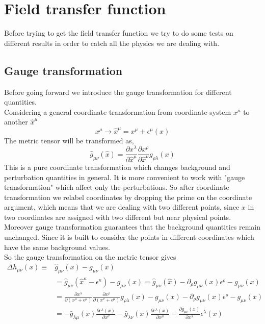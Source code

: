 \documentclass[a4paper,14pt]{article}
\newcommand {\be}{\begin{equation}}
\newcommand {\ee}{\end{equation}}
\begin{document}
\section{Field transfer function}
Before trying to get the field transfer function we try to do some tests on different results in order to catch all the physics we are dealing with.
\subsection{Gauge transformation}
Before going forward we introduce the gauge transformation for different quantities. \\
Considering a general coordinate transformation from coordinate system $x^{\mu}$ to another $\hat{x} ^{\mu}$ 
\be
x^{\mu} \longrightarrow {\hat{x}}^{\mu}  = x^{\mu} + \epsilon^{\mu} (x)
\ee
The metric tensor will be transformed as,
\be
\hat{g}_{\mu \nu} (\hat{x})=  \frac{\partial x^{\lambda}}{\partial \hat{x}^{\mu} } \frac{\partial x^{\rho}}{\partial \hat{x}^{\nu} } g _{\rho \lambda} (x)
\ee
This is a pure coordinate transformation which changes background and perturbation quantities in general. It is more convenient to work with "gauge transformation" which affect only the perturbations. So after coordinate transformation we relabel coordinates by dropping the prime on the coordinate argument, which means that we are dealing with two different points, since $x$ in two coordinates are assigned with two different but near physical points. Moreover gauge transformation guarantees that the background quantities remain unchanged. Since it is built to consider the points in different coordinates which have the same background values.\\ 
So the gauge transformation on the metric tensor gives 
\begin{align}
\Delta h_{\mu \nu} (x)   \equiv  &\hat{g}_{\mu \nu}(x) - g_{\mu \nu} (x) \\ \nonumber &
=\hat{g}_{\mu \nu}(\hat{x}^{ \kappa} -\epsilon^{\kappa}) - g_{\mu \nu} (x) =\hat{g}_{\mu \nu}(\hat{x} ) - \partial_{\rho } g_{\mu \nu} (x^{}) \epsilon^{\rho}  - g_{\mu \nu} (x)
 \\ \nonumber &
 =   \frac{\partial x^{\lambda}}{\partial( x^{\mu} +\epsilon ^{\mu}) } \frac{\partial x^{\rho}}{\partial( x^{\nu} +\epsilon ^{\mu})} g_{\rho \lambda} (x) - g_{\mu \nu} (x) - \partial_{\rho } g_{\mu \nu} (x^{}) \epsilon^{\rho}  - g_{\mu \nu} (x)
  \\ \nonumber &
 = - \bar{g} _{\lambda \mu} (x) \frac{\partial \epsilon ^{\lambda} (x) }{\partial x^{\nu}} -  \bar{g} _{\lambda \nu} (x) \frac{\partial \epsilon ^{\lambda} (x) }{\partial x^{\mu}} - \frac{\partial \bar{g}_{\mu \nu} (x)  }{\partial x^{\lambda } } \epsilon^{\lambda} (x) 
\end{align}
\end{document}

